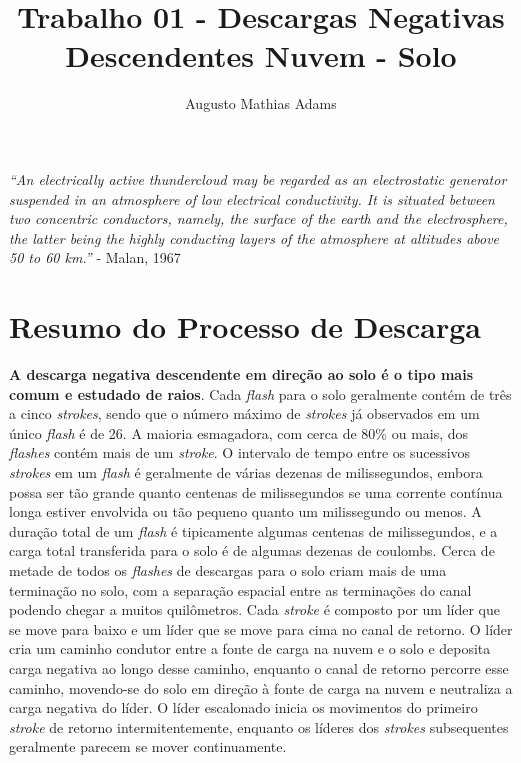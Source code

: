 \documentclass[a4paper, 12pt, onecolumn,singlespacing]{article}
\title{Trabalho 01 - Descargas Negativas Descendentes Nuvem - Solo}
\author[1]{Augusto Mathias Adams}
\affil[1]{augusto.adams@ufpr.br}
\begin{document}
	
	\maketitle

	\textit{``An electrically active thundercloud may be regarded as an
	electrostatic generator suspended in an atmosphere of low
	electrical conductivity. It is situated between two concentric
	conductors, namely, the surface of the earth and the
	electrosphere, the latter being the highly conducting layers of the
	atmosphere at altitudes above 50 to 60 km.''} - Malan, 1967

	\section{Resumo do Processo de Descarga}
	
	\textbf{A descarga negativa descendente em direção ao solo é o tipo mais comum e estudado de raios}. Cada \textit{flash} para o solo geralmente contém de três a cinco \textit{strokes}, sendo que o número máximo de \textit{strokes} já observados em um único \textit{flash} é de 26. A maioria esmagadora, com cerca de 80\% ou mais, dos \textit{flashes} contém mais de um \textit{stroke}. O intervalo de tempo entre os sucessivos \textit{strokes} em um \textit{flash} é geralmente de várias dezenas de milissegundos, embora possa ser tão grande quanto centenas de milissegundos se uma corrente contínua longa estiver envolvida ou tão pequeno quanto um milissegundo ou menos. A duração total de um \textit{flash} é tipicamente algumas centenas de milissegundos, e a carga total transferida para o solo é de algumas dezenas de coulombs. Cerca de metade de todos os \textit{flashes} de descargas para o solo criam mais de uma terminação no solo, com a separação espacial entre as terminações do canal podendo chegar a muitos quilômetros. Cada \textit{stroke} é composto por um líder que se move para baixo e um líder que se move para cima no canal de retorno. O líder cria um caminho condutor entre a fonte de carga na nuvem e o solo e deposita carga negativa ao longo desse caminho, enquanto o canal de retorno percorre esse caminho, movendo-se do solo em direção à fonte de carga na nuvem e neutraliza a carga negativa do líder. O líder escalonado inicia os movimentos do primeiro \textit{stroke} de retorno intermitentemente, enquanto os líderes dos \textit{strokes} subsequentes geralmente parecem se mover continuamente\cite{RAKOV_UHMAN}.
	
\end{document}
